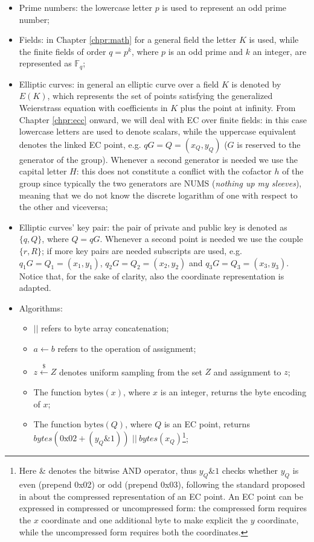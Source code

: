 \begin{itemize}
\item Prime numbers: the lowercase letter $p$ is used to represent an odd prime number;
\item Fields: in Chapter \ref{chpr:math} for a general field the letter $K$ is used, while the finite fields of order $q = p^k$, where $p$ is an odd prime and $k$ an integer, are represented as $\mathbb{F}_q$;
\item Elliptic curves: in general an elliptic curve over a field $K$ is denoted by $E(K)$, which represents the set of points satisfying the generalized Weierstrass equation with coefficients in $K$ plus the point at infinity. From Chapter \ref{chpr:ecc} onward, we will deal with EC over finite fields: in this case lowercase letters are used to denote scalars, while the uppercase equivalent denotes the linked EC point, e.g. $qG = Q = (x_Q, y_Q)$ ($G$ is reserved to the generator of the group). Whenever a second generator is needed we use the capital letter $H$: this does not constitute a conflict with the cofactor $h$ of the group since typically the two generators are NUMS (\textit{nothing up my sleeves}), meaning that we do not know the discrete logarithm of one with respect to the other and viceversa;
\item Elliptic curves' key pair: the pair of private and public key is denoted as $\{q, Q\}$, where $Q = qG$. Whenever a second point is needed we use the couple $\{r, R\}$; if more key pairs are needed subscripts are used, e.g. $q_1G = Q_1 = (x_1, y_1)$, $q_2G = Q_2 = (x_2, y_2)$ and $q_3G = Q_3 = (x_3, y_3)$. Notice that, for the sake of clarity, also the coordinate representation is adapted.
\item Algorithms:
    \begin{itemize}
		\item $||$ refers to byte array concatenation;
		\item $a \gets b$ refers to the operation of assignment;
		\item $z \xleftarrow{\text{\$}} Z$ denotes uniform sampling from the set $Z$ and assignment to $z$;
		\item The function $\text{bytes}(x)$, where $x$ is an integer, returns the byte encoding of $x$;
		\item The function $\text{bytes}(Q)$, where $Q$ is an EC point, returns $bytes(0\text{x}02 + (y_Q \& 1))$ $ || \ bytes(x_Q)$\footnote{Here \& denotes the bitwise AND operator, thus $y_Q \& 1$ checks whether $y_Q$ is even (prepend 0x02) or odd (prepend 0x03), following the standard proposed in \cite{RefWork:2} about the compressed representation of an EC point. An EC point can be expressed in compressed or uncompressed form: the compressed form requires the $x$ coordinate and one additional byte to make explicit the $y$ coordinate, while the uncompressed form requires both the coordinates.};

\end{itemize}
\end{itemize}
